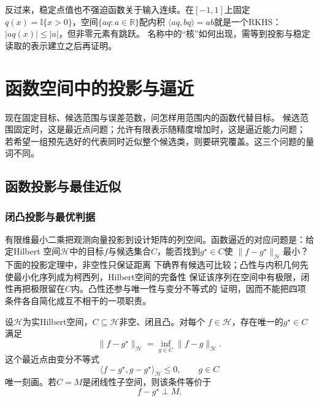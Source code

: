 反过来，稳定点值也不强迫函数关于输入连续。在$[-1,1]$上固定
$q(x)=\mathbb I\{x>0\}$，空间$\{a q:a\in\mathbb R\}$配内积
$\langle aq,bq\rangle=ab$就是一个RKHS：$|aq(x)|\leq|a|$，但非零元素有跳跃。
名称中的“核”如何出现，需等到投影与稳定读取的表示建立之后再证明。

\section{函数空间中的投影与逼近}
\label{sec:functional-orthogonal-expansions-projections}

现在固定目标、候选范围与误差范数，问怎样用范围内的函数代替目标。
候选范围固定时，这是最近点问题；允许有限表示随精度增加时，这是逼近能力问题；
若希望一组预先选好的代表同时近似整个候选类，则要研究覆盖。这三个问题的量词不同。

\subsection{函数投影与最佳近似}

\subsubsection{闭凸投影与最优判据}

有限维最小二乘把观测向量投影到设计矩阵的列空间。函数逼近的对应问题是：给定Hilbert
空间$\mathcal{H}$中的目标$f$与候选集合$C$，能否找到$g^\star\in C$使
$\lVert f-g^\star\rVert_{\mathcal{H}}$最小？下面的投影定理中，非空性只保证距离
下确界有候选可比较；凸性与内积几何先使最小化序列成为柯西列，Hilbert空间的完备性
保证该序列在空间中有极限，闭性再把极限留在$C$内。凸性还参与唯一性与变分不等式的
证明，因而不能把四项条件各自简化成互不相干的一项职责。

\begin{theorem}[Hilbert空间投影定理]
\label{thm:functional-hilbert-projection}
设$\mathcal{H}$为实Hilbert空间，$C\subseteq\mathcal{H}$非空、闭且凸。对每个
$f\in\mathcal{H}$，存在唯一的$g^\star\in C$满足
\[
  \lVert f-g^\star\rVert_{\mathcal{H}}
  =\inf_{g\in C}\lVert f-g\rVert_{\mathcal{H}}.
\]
这个最近点由变分不等式
\begin{equation}
  \langle f-g^\star,g-g^\star\rangle_{\mathcal{H}}
  \leq0,\qquad g\in C
  \label{eq:functional-convex-projection-characterization}
\end{equation}
唯一刻画。若$C=M$是闭线性子空间，则该条件等价于
\begin{equation}
  f-g^\star\perp M.
  \label{eq:functional-subspace-projection-orthogonality}
\end{equation}
\end{theorem}

